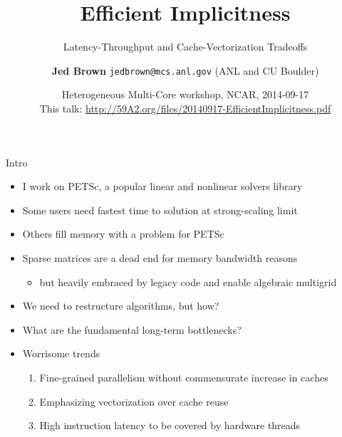 \documentclass{beamer}
\title{Efficient Implicitness}
\subtitle{Latency-Throughput and Cache-Vectorization Tradeoffs}
\author{{\bf Jed Brown} \texttt{jedbrown@mcs.anl.gov} (ANL and CU Boulder)
}
\date{Heterogeneous Multi-Core workshop, NCAR, 2014-09-17 \\[1em]
{\small This talk: \url{http://59A2.org/files/20140917-EfficientImplicitness.pdf}}}
\begin{document}
\lstset{language=C}
\normalem

\begin{frame}
  \titlepage
\end{frame}

\begin{frame}{Intro}
  \begin{itemize}
  \item I work on PETSc, a popular linear and nonlinear solvers library
  \item Some users need fastest time to solution at strong-scaling limit
  \item Others fill memory with a problem for PETSc
  \item Sparse matrices are a dead end for memory bandwidth reasons
    \begin{itemize}
    \item but heavily embraced by legacy code and enable algebraic multigrid
    \end{itemize}
  \item We need to restructure algorithms, but how?
  \item What are the fundamental long-term bottlenecks?
  \item<2> Worrisome trends
    \begin{enumerate}
    \item Fine-grained parallelism without commensurate increase in caches
    \item Emphasizing vectorization over cache reuse
    \item High instruction latency to be covered by hardware threads
    \end{enumerate}
  \end{itemize}
\end{frame}


\end{document}
